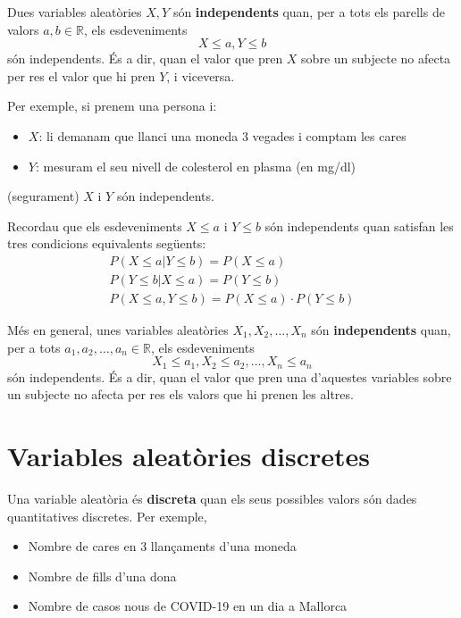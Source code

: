 \documentclass[
]{book}
\providecommand{\tightlist}{%
  \setlength{\itemsep}{0pt}\setlength{\parskip}{0pt}}
\renewcommand{\leq}{\leqslant}
\theoremstyle{definition}
\theoremstyle{definition}
\theoremstyle{definition}
\theoremstyle{remark}
\begin{document}
Dues variables aleatòries \(X,Y\) són \textbf{independents} quan, per a tots els parells de valors \(a,b\in \mathbb{R}\), els esdeveniments
\[
X\leq a, Y\leq b
\]
són independents. És a dir, quan el valor que pren \(X\) sobre un subjecte no afecta per res el valor que hi pren \(Y\), i viceversa.

Per exemple, si prenem una persona i:

\begin{itemize}
\item
  \(X\): li demanam que llanci una moneda 3 vegades i comptam les cares
\item
  \(Y\): mesuram el seu nivell de colesterol en plasma (en mg/dl)
\end{itemize}

(segurament) \(X\) i \(Y\) són independents.

\begin{rmdrecordau}
Recordau que els esdeveniments \(X\leq a\) i \(Y\leq b\) són independents quan satisfan les tres condicions equivalents següents:
\[
\begin{array}{l}
P(X\leq a|Y\leq b)=P(X\leq a)\\
P(Y\leq b|X\leq a)=P(Y\leq b)\\
P(X\leq a, Y\leq b)=P(X\leq a)\cdot P(Y\leq b)
\end{array}
\]
\end{rmdrecordau}

Més en general, unes variables aleatòries \(X_1,X_2,\ldots,X_n\) són \textbf{independents} quan, per a tots \(a_1,a_2,\ldots,a_n\in \mathbb{R}\), els esdeveniments
\[
X_1\leq a_1, X_2\leq a_2,\ldots, X_n\leq a_n
\]
són independents. És a dir, quan el valor que pren una d'aquestes variables sobre un subjecte no afecta per res els valors que hi prenen les altres.

\hypertarget{variables-aleatuxf2ries-discretes}{%
\section{Variables aleatòries discretes}\label{variables-aleatuxf2ries-discretes}}

Una variable aleatòria és \textbf{discreta} quan els seus possibles valors són dades quantitatives discretes. Per exemple,

\begin{itemize}
\tightlist
\item
  Nombre de cares en 3 llançaments d'una moneda
\item
  Nombre de fills d'una dona
\item
  Nombre de casos nous de COVID-19 en un dia a Mallorca
\end{itemize}
\end{document}
